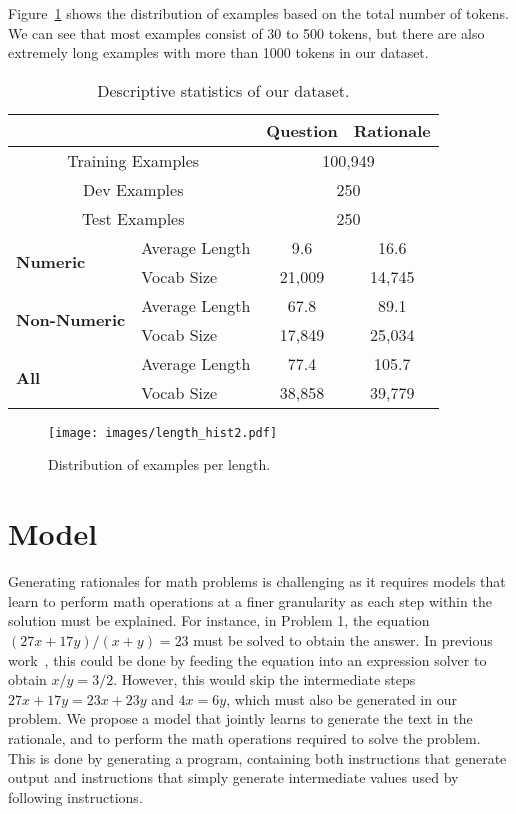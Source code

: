 Figure~\ref{histogram} shows the distribution of examples based on the total number of tokens. We can see that most examples consist of 30 to 500 tokens, but there are also extremely long examples with more than 1000 tokens in our dataset.

\begin{table}[t]
\centering
\small
\begin{tabular}{|l|l|c|c|}
\hline
\multicolumn{2}{|c|}{} & \textbf{Question} & \textbf{Rationale} \\
\hline\hline
\multicolumn{2}{|c|}{Training Examples} & \multicolumn{2}{c|}{100,949}\\
\multicolumn{2}{|c|}{Dev Examples} & \multicolumn{2}{c|}{250}\\
\multicolumn{2}{|c|}{Test Examples} & \multicolumn{2}{c|}{250}\\
\hline\hline
\multirow{2}{*}{\textbf{Numeric}}&Average Length& 9.6 & 16.6 \\
&Vocab Size  & 21,009 & 14,745 \\
\hline
\multirow{2}{*}{\textbf{Non-Numeric}}&Average Length  & 67.8 & 89.1 \\
&Vocab Size & 17,849 & 25,034 \\
\hline\hline
\multirow{2}{*}{\textbf{All}}&Average Length  & 77.4 & 105.7 \\
&Vocab Size & 38,858 & 39,779 \\
\hline
\end{tabular}
\caption{Descriptive statistics of our dataset.}\label{stats}
\end{table}

\begin{figure}[t]
  \begin{center}
    \centerline{\texttt{[image: images/length\_hist2.pdf]}}
    \vspace{-0.5cm}
    \caption{Distribution of examples per length.}
    \label{histogram}
  \end{center}
\end{figure}

\section{Model}
\label{sec:model}

Generating rationales for math problems is challenging as it requires models that learn to perform math operations at a finer granularity as each step within the solution must be explained. For instance, in Problem 1, the equation $(27x + 17y) / (x + y) = 23$ must be solved to obtain the answer. In previous work~\cite{kushman-EtAl:2014:P14-1}, this could be done by feeding the equation into an expression solver to obtain $x/y = 3/2$. However, this would skip the intermediate steps $27x + 17y = 23x + 23y$ and $4x = 6y$, which must also be generated in our problem. We propose a model that jointly learns to generate the text in the rationale, and to perform the math operations required to solve the problem. This is done by generating a program, containing both instructions that generate output and instructions that simply generate intermediate values used by following instructions.

